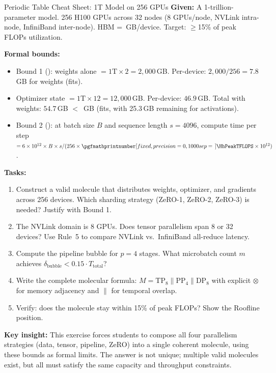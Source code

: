 \documentclass[10pt,twocolumn]{article}
\newcommand{\cvalint}[1]{\pgfmathprintnumber[fixed, precision=0, 1000 sep={\,}]{#1}}
\begin{document}
\begin{exercise}{Periodic Table Cheat Sheet: 1T Model on 256 GPUs}
\textbf{Given:} A 1-trillion-parameter model. 256 H100 GPUs across 32 nodes (8 GPUs/node, NVLink intra-node, InfiniBand inter-node). HBM = \cvalint{\HhHBMGB}\,GB/device. Target: $\geq$15\% of peak FLOPs utilization.

\textbf{Formal bounds:}
\begin{itemize}[nosep]
\item Bound 1 (): weights alone $= 1\text{T} \times 2 = 2{,}000$\,GB. Per-device: $2{,}000/256 = 7.8$\,GB for weights (fits).
\item Optimizer state $= 1\text{T} \times 12 = 12{,}000$\,GB. Per-device: $46.9$\,GB. Total with weights: $54.7$\,GB $<$ \cvalint{\HhHBMGB}\,GB (fits, with 25.3\,GB remaining for activations).
\item Bound 2 (): at batch size $B$ and sequence length $s = 4096$, compute time per step $= 6 \times 10^{12} \times B \times s / (256 \times \cvalint{\HhPeakTFLOPS} \times 10^{12})$.
\end{itemize}

\textbf{Tasks:}
\begin{enumerate}[nosep, leftmargin=*]
\item Construct a valid molecule that distributes weights, optimizer, and gradients across 256 devices. Which sharding strategy (ZeRO-1, ZeRO-2, ZeRO-3) is needed? Justify with Bound 1.
\item The NVLink domain is 8 GPUs. Does tensor parallelism span 8 or 32 devices? Use Rule~5 to compare NVLink vs.\ InfiniBand all-reduce latency.
\item Compute the pipeline bubble for $p = 4$ stages. What microbatch count $m$ achieves $\delta_{\text{bubble}} < 0.15 \cdot T_{\text{total}}$?
\item Write the complete molecular formula: $M = \text{TP}_8 \parallel \text{PP}_4 \parallel \text{DP}_8$ with explicit $\otimes$ for memory adjacency and $\parallel$ for temporal overlap.
\item Verify: does the molecule stay within 15\% of peak FLOPs? Show the Roofline position.
\end{enumerate}

\textbf{Key insight:} This exercise forces students to compose all four parallelism strategies (data, tensor, pipeline, ZeRO) into a single coherent molecule, using these bounds as formal limits. The answer is not unique; multiple valid molecules exist, but all must satisfy the same capacity and throughput constraints.
\end{exercise}
\end{document}
